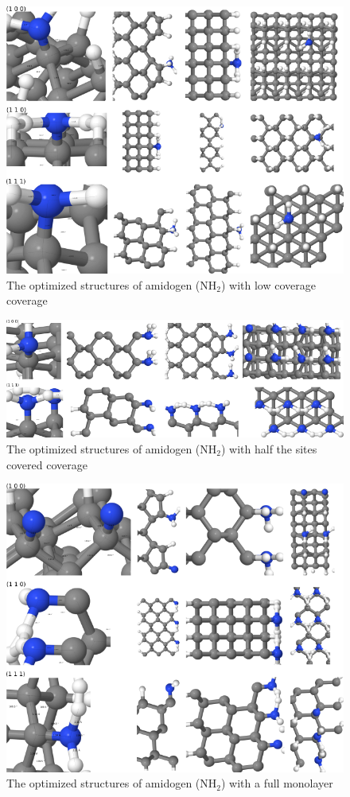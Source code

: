 \documentclass[12pt,a4paper]{article}
\begin{document}
\begin{figure} \captionsetup{width=.8\linewidth} \caption{The optimized structures of amidogen (NH$_2$) with low coverage coverage} \label{NH2_summary_low}
\includegraphics[width=.8\linewidth]{pictures/NH2_summary_low.png}
\end{figure}

\begin{figure} \captionsetup{width=.8\linewidth} \caption{The optimized structures of amidogen (NH$_2$) with half the sites covered coverage} \label{NH2_summary_covered}
\includegraphics[width=.8\linewidth]{pictures/NH2_summary_covered.png}
\end{figure}

\begin{figure} \captionsetup{width=.8\linewidth} \caption{The optimized structures of amidogen (NH$_2$) with a full monolayer} \label{NH2_summary_half}
\includegraphics[width=.8\linewidth]{pictures/NH2_summary_half.png}
\end{figure}
\end{document}
